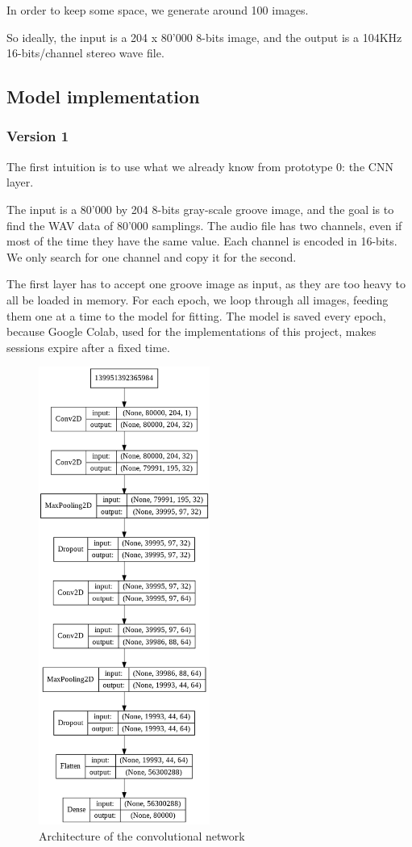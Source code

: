\documentclass[12pt, twoside]{article}
\begin{document}
In order to keep some space, we generate around 100 images.

So ideally, the input is a 204 x 80'000 8-bits image, and the output is a 104KHz 16-bits/channel stereo wave file.
\subsection{Model implementation}
\subsubsection{Version 1}
The first intuition is to use what we already know from prototype 0: the CNN layer.

The input is a 80'000 by 204 8-bits gray-scale groove image, and the goal is to find the WAV data of 80'000 samplings.
The audio file has two channels, even if most of the time they have the same value. Each channel is encoded in 16-bits. We only search for one channel and copy it for the second.

The first layer has to accept one groove image as input, as they are too heavy to all be loaded in memory. For each epoch, we loop through all images, feeding them one at a time to the model for fitting. The model is saved every epoch, because Google Colab, used for the implementations of this project, makes sessions expire after a fixed time.

\begin{figure}
	\centering
	\includegraphics[width=0.5\textwidth]{../images/model_v1.png}
	\caption{Architecture of the convolutional network}
	\label{archiv1}
\end{figure}
\end{document}
